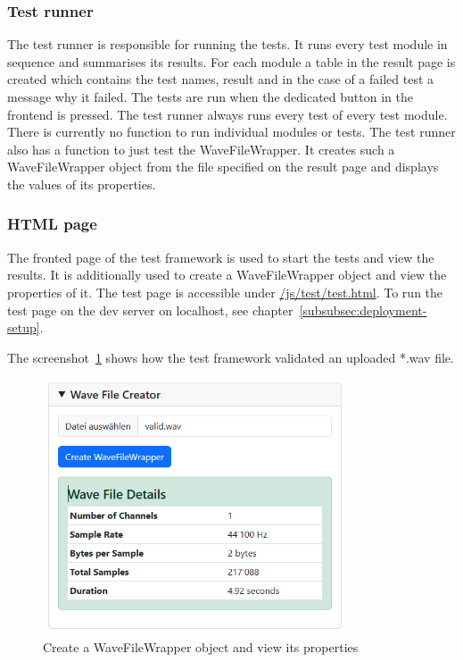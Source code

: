 \subsubsection{Test runner}
The test runner is responsible for running the tests.
It runs every test module in sequence and summarises its results.
For each module a table in the result page is created which contains the test names, result and in the case of a failed test a message why it failed.
The tests are run when the dedicated button in the frontend is pressed.
The test runner always runs every test of every test module.
There is currently no function to run individual modules or tests.
The test runner also has a function to just test the WaveFileWrapper.
It creates such a WaveFileWrapper object from the file specified on the result page and displays the values of its properties.

\subsubsection{HTML page}
The fronted page of the test framework is used to start the tests and view the results.
It is additionally used to create a WaveFileWrapper object and view the properties of it.
The test page is accessible under \href{https://decibel-threshold-event-displayer.github.io/js/test/test.html}{/js/test/test.html}.
To run the test page on the dev server on localhost, see chapter~\ref{subsubsec:deployment-setup}.

The screenshot~\ref{fig:create-a-wavefilewrapper-object} shows how the test framework validated an uploaded *.wav file.
\begin{figure}[H]
    \centering
    \includegraphics[width=0.8\textwidth]{../assets/wavefilecreator.png}
    \caption{Create a WaveFileWrapper object and view its properties}\label{fig:create-a-wavefilewrapper-object}
\end{figure}

